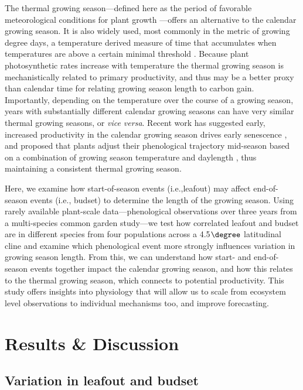 \documentclass{article}[12pt]
\begin{document}
The thermal growing season---defined here as the period of favorable meteorological conditions for plant growth \citep{Korner2023}---offers an alternative to the calendar growing season. It is also widely used, most commonly in the metric of growing degree days, a temperature derived measure of time that accumulates when temperatures are above a certain minimal threshold \citep{CHUINE2000337,Moore:2014wl,YANG199561}. Because plant photosynthetic rates increase with temperature \citep{Farquhar:1980vm} the thermal growing season is mechanistically related to primary productivity, and thus may be a better proxy than calendar time for relating growing season length to carbon gain. Importantly, depending on the temperature over the course of a growing season, years with substantially different calendar growing seasons can have very similar thermal growing seasons, or \emph{vice versa}. Recent work has suggested early, increased productivity in the calendar growing season drives early senescence \citep{Zani2020}, and proposed that plants adjust their phenological trajectory mid-season based on a combination of growing season temperature and daylength \citep{Zohner2023}, thus maintaining a consistent thermal growing season. 

Here, we examine how start-of-season events (i.e.,leafout) may affect end-of-season events (i.e., budset) to determine the length of the growing season. Using rarely available plant-scale data---phenological observations over three years from a multi-species common garden study---we test how correlated leafout and budset are in different species from four populations across a 4.5$\degree$ latitudinal cline and examine which phenological event more strongly influences variation in growing season length. From this, we can understand how start- and end-of-season events together impact the calendar growing season, and how this relates to the thermal growing season, which connects to potential productivity. This study offers insights into physiology that will allow us to scale from ecosystem level observations to individual mechanisms too, and improve forecasting. %

\section{Results \& Discussion} 
\subsection{Variation in leafout and budset}
\end{document}
